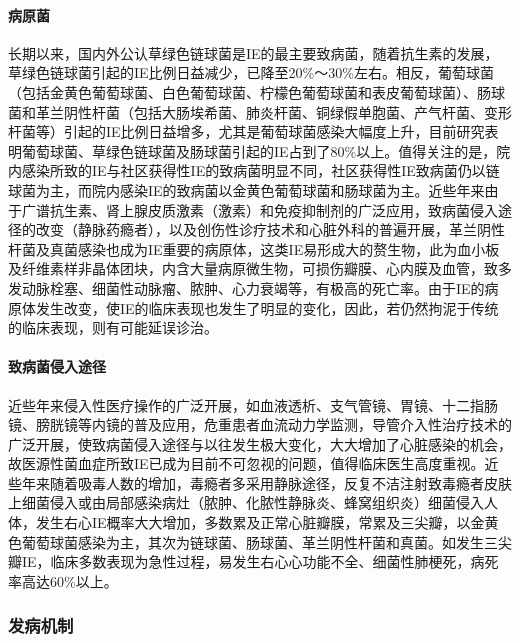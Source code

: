 \paragraph{病原菌}

长期以来，国内外公认草绿色链球菌是IE的最主要致病菌，随着抗生素的发展，草绿色链球菌引起的IE比例日益减少，已降至20\%～30\%左右。相反，葡萄球菌（包括金黄色葡萄球菌、白色葡萄球菌、柠檬色葡萄球菌和表皮葡萄球菌）、肠球菌和革兰阴性杆菌（包括大肠埃希菌、肺炎杆菌、铜绿假单胞菌、产气杆菌、变形杆菌等）引起的IE比例日益增多，尤其是葡萄球菌感染大幅度上升，目前研究表明葡萄球菌、草绿色链球菌及肠球菌引起的IE占到了80\%以上。值得关注的是，院内感染所致的IE与社区获得性IE的致病菌明显不同，社区获得性IE致病菌仍以链球菌为主，而院内感染IE的致病菌以金黄色葡萄球菌和肠球菌为主。近些年来由于广谱抗生素、肾上腺皮质激素（激素）和免疫抑制剂的广泛应用，致病菌侵入途径的改变（静脉药瘾者），以及创伤性诊疗技术和心脏外科的普遍开展，革兰阴性杆菌及真菌感染也成为IE重要的病原体，这类IE易形成大的赘生物，此为血小板及纤维素样非晶体团块，内含大量病原微生物，可损伤瓣膜、心内膜及血管，致多发动脉栓塞、细菌性动脉瘤、脓肿、心力衰竭等，有极高的死亡率。由于IE的病原体发生改变，使IE的临床表现也发生了明显的变化，因此，若仍然拘泥于传统的临床表现，则有可能延误诊治。

\paragraph{致病菌侵入途径}

近些年来侵入性医疗操作的广泛开展，如血液透析、支气管镜、胃镜、十二指肠镜、膀胱镜等内镜的普及应用，危重患者血流动力学监测，导管介入性治疗技术的广泛开展，使致病菌侵入途径与以往发生极大变化，大大增加了心脏感染的机会，故医源性菌血症所致IE已成为目前不可忽视的问题，值得临床医生高度重视。近些年来随着吸毒人数的增加，毒瘾者多采用静脉途径，反复不洁注射致毒瘾者皮肤上细菌侵入或由局部感染病灶（脓肿、化脓性静脉炎、蜂窝组织炎）细菌侵入人体，发生右心IE概率大大增加，多数累及正常心脏瓣膜，常累及三尖瓣，以金黄色葡萄球菌感染为主，其次为链球菌、肠球菌、革兰阴性杆菌和真菌。如发生三尖瓣IE，临床多数表现为急性过程，易发生右心心功能不全、细菌性肺梗死，病死率高达60\%以上。

\subsubsection{发病机制}

